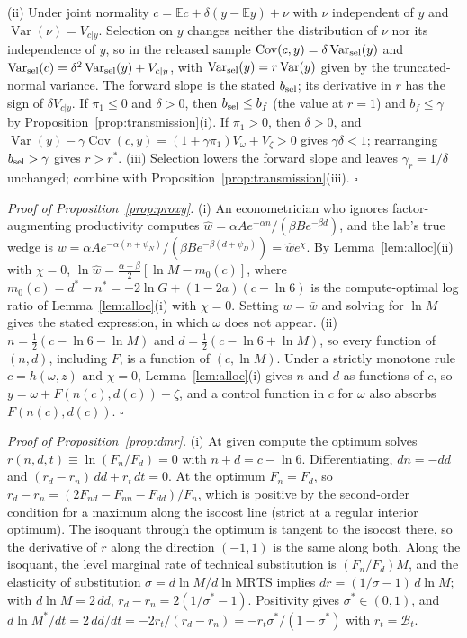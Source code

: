 \documentclass[AER,finalmode]{AEA}
\theoremstyle{definition}
\theoremstyle{remark}
\providecommand{\E}{\mathbb{E}}
\providecommand{\Var}{\operatorname{Var}}
\providecommand{\Cov}{\operatorname{Cov}}
\begin{document}
(ii) Under joint normality $c=\E c+\delta(y-\E y)+\nu$ with $\nu$ independent of $y$ and $\Var(\nu)=V_{c|y}$. Selection
on $y$ changes neither the distribution of $\nu$ nor its independence of $y$, so in the released sample
$\Cov(c,y)=\delta\Var_{\rm sel}(y)$ and $\Var_{\rm sel}(c)=\delta^2\Var_{\rm sel}(y)+V_{c|y}$, with
$\Var_{\rm sel}(y)=r\Var(y)$ given by the truncated-normal variance. The forward slope is the stated $b_{\rm sel}$; its
derivative in $r$ has the sign of $\delta V_{c|y}$. If $\pi_1\le0$ and $\delta>0$, then $b_{\rm sel}\le b_f$ (the value
at $r=1$) and $b_f\le\gamma$ by Proposition~\ref{prop:transmission}(i). If $\pi_1>0$, then $\delta>0$, and
$\Var(y)-\gamma\Cov(c,y)=(1+\gamma\pi_1)V_\omega+V_\zeta>0$ gives $\gamma\delta<1$; rearranging $b_{\rm sel}>\gamma$ gives
$r>r^*$. (iii) Selection lowers the forward slope and leaves $\gamma_r=1/\delta$ unchanged; combine with
Proposition~\ref{prop:transmission}(iii). $\square$

\textit{Proof of Proposition~\ref{prop:proxy}.} (i) An econometrician who ignores factor-augmenting productivity computes
$\hat w=\alpha Ae^{-\alpha n}/(\beta Be^{-\beta d})$, and the lab's true wedge is
$w=\alpha Ae^{-\alpha(n+\psi_N)}/(\beta Be^{-\beta(d+\psi_D)})=\hat we^{\chi}$. By Lemma~\ref{lem:alloc}(ii) with
$\chi=0$, $\ln\hat w=\tfrac{\alpha+\beta}{2}[\ln M-m_0(c)]$, where $m_0(c)=d^*-n^*=-2\ln G+(1-2a)(c-\ln6)$ is the
compute-optimal log ratio of Lemma~\ref{lem:alloc}(i) with $\chi=0$. Setting $w=\bar w$ and solving for $\ln M$ gives
the stated expression, in which $\omega$ does not appear. (ii) $n=\tfrac12(c-\ln6-\ln M)$ and
$d=\tfrac12(c-\ln6+\ln M)$, so every function of $(n,d)$, including $F$, is a function of $(c,\ln M)$. Under a strictly
monotone rule $c=h(\omega,z)$ and $\chi=0$, Lemma~\ref{lem:alloc}(i) gives $n$ and $d$ as functions of $c$, so
$y=\omega+F(n(c),d(c))-\zeta$, and a control function in $c$ for $\omega$ also absorbs $F(n(c),d(c))$. $\square$

\textit{Proof of Proposition~\ref{prop:dmr}.} (i) At given compute the optimum solves $r(n,d,t)\equiv\ln(F_n/F_d)=0$
with $n+d=c-\ln6$. Differentiating, $dn=-dd$ and $(r_d-r_n)\,dd+r_t\,dt=0$. At the optimum $F_n=F_d$, so
$r_d-r_n=(2F_{nd}-F_{nn}-F_{dd})/F_n$, which is positive by the second-order condition for a maximum along the isocost
line (strict at a regular interior optimum). The isoquant through the optimum is tangent to the isocost there, so the
derivative of $r$ along the direction $(-1,1)$ is the same along both. Along the isoquant, the level marginal rate of
technical substitution is $(F_n/F_d)M$, and the elasticity of substitution $\sigma=d\ln M/d\ln\text{MRTS}$ implies
$dr=(1/\sigma-1)\,d\ln M$; with $d\ln M=2\,dd$, $r_d-r_n=2(1/\sigma^*-1)$. Positivity gives $\sigma^*\in(0,1)$, and
$d\ln M^*/dt=2\,dd/dt=-2r_t/(r_d-r_n)=-r_t\sigma^*/(1-\sigma^*)$ with $r_t=\mathcal B_t$.
\end{document}
